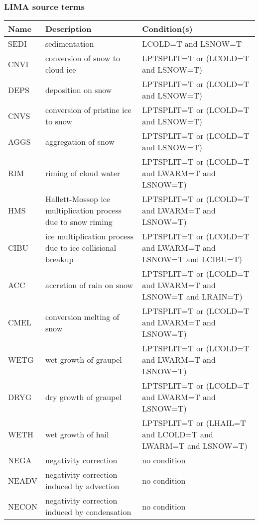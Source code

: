 \subsubsection{LIMA source terms}

\begin{longtable} {|p{}|p{}|p{}|}
\hline
Name & Description & Condition(s) \\
\hline \hline
\endhead
SEDI   & sedimentation                                 & LCOLD=T and LSNOW=T \\\hline
CNVI   & conversion of snow to cloud ice               & LPTSPLIT=T or (LCOLD=T and LSNOW=T) \\\hline
DEPS   & deposition on snow                            & LPTSPLIT=T or (LCOLD=T and LSNOW=T) \\\hline
CNVS   & conversion of pristine ice to snow            & LPTSPLIT=T or (LCOLD=T and LSNOW=T) \\\hline
AGGS   & aggregation of snow                           & LPTSPLIT=T or (LCOLD=T and LSNOW=T) \\\hline
RIM    & riming of cloud water                         & LPTSPLIT=T or (LCOLD=T and LWARM=T and LSNOW=T) \\\hline
HMS    & Hallett-Mossop ice multiplication process due to snow riming    & LPTSPLIT=T or (LCOLD=T and LWARM=T and LSNOW=T) \\\hline
CIBU   & ice multiplication process due to ice collisional breakup & LPTSPLIT=T or (LCOLD=T and LWARM=T and LSNOW=T and LCIBU=T) \\\hline
ACC    & accretion of rain on snow                     & LPTSPLIT=T or (LCOLD=T and LWARM=T and LSNOW=T and LRAIN=T) \\\hline
CMEL   & conversion melting of snow                    & LPTSPLIT=T or (LCOLD=T and LWARM=T and LSNOW=T) \\\hline
WETG   & wet growth of graupel                         & LPTSPLIT=T or (LCOLD=T and LWARM=T and LSNOW=T) \\\hline
DRYG   & dry growth of graupel                         & LPTSPLIT=T or (LCOLD=T and LWARM=T and LSNOW=T) \\\hline
WETH   & wet growth of hail                            & LPTSPLIT=T or (LHAIL=T and LCOLD=T and LWARM=T and LSNOW=T) \\\hline
NEGA   & negativity correction                         & no condition \\\hline
NEADV  & negativity correction induced by advection    & no condition \\\hline
NECON  & negativity correction induced by condensation & no condition \\\hline
\end{longtable}

